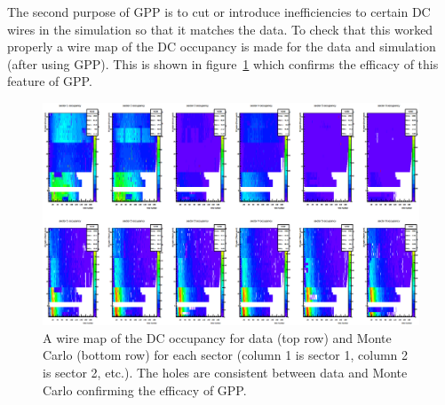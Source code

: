 The second purpose of GPP is to cut or introduce inefficiencies to certain DC wires in the simulation so that it matches the data.
To check that this worked properly a wire map of the DC occupancy is made for the data and simulation (after using GPP).
This is shown in figure~\ref{fig:DCoccupancy} which confirms the efficacy of this feature of GPP.
%
\begin{figure}
\centering
\includegraphics[width=8.5in]{figures/DCoccupancy.png}
\caption{A wire map of the DC occupancy for data (top row) and Monte Carlo (bottom row) for each sector (column 1 is sector 1, column 2 is sector 2, etc.). The holes are consistent between data and Monte Carlo confirming the efficacy of GPP.}
\label{fig:DCoccupancy}
\end{figure}
%

